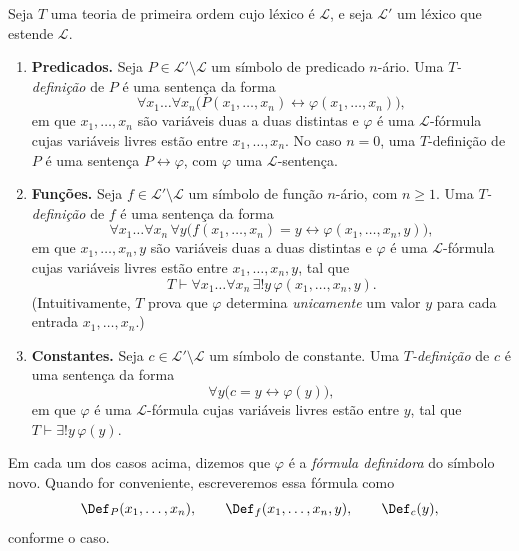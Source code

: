 \begin{metadefinition}[Definições]\label{mdef:definicaoExplicita}
Seja $T$ uma teoria de primeira ordem cujo léxico é $\mathcal L$, e seja $\mathcal L'$ um léxico que estende $\mathcal L$.

\begin{enumerate}[label=(\roman*)]
    \item \textbf{Predicados.}
    Seja $P\in\mathcal L'\setminus\mathcal L$ um símbolo de predicado $n$-ário.
    Uma \emph{$T$-definição} de $P$ é uma sentença da forma
    \[
        \forall x_1\ldots \forall x_n\bigl(P(x_1,\ldots,x_n)\leftrightarrow \varphi(x_1,\ldots,x_n)\bigr),
    \]
    em que $x_1,\ldots,x_n$ são variáveis duas a duas distintas e $\varphi$ é uma $\mathcal L$-fórmula cujas variáveis livres estão entre $x_1,\ldots,x_n$.
    No caso $n=0$, uma $T$-definição de $P$ é uma sentença $P\leftrightarrow \varphi$,
    com $\varphi$ uma $\mathcal L$-sentença.

    \item \textbf{Funções.}
    Seja $f\in\mathcal L'\setminus\mathcal L$ um símbolo de função $n$-ário, com $n\geq 1$.
    Uma \emph{$T$-definição} de $f$ é uma sentença da forma
    \[
        \forall x_1\ldots \forall x_n\,\forall y\bigl(f(x_1,\ldots,x_n)=y \leftrightarrow \varphi(x_1,\ldots,x_n,y)\bigr),
    \]
    em que $x_1,\ldots,x_n,y$ são variáveis duas a duas distintas e $\varphi$ é uma $\mathcal L$-fórmula cujas variáveis livres estão entre $x_1,\ldots,x_n,y$, tal que
    \[
        T\vdash \forall x_1\ldots \forall x_n\,\exists!y\,\varphi(x_1,\ldots,x_n,y).
    \]
    (Intuitivamente, $T$ prova que $\varphi$ determina \emph{unicamente} um valor $y$ para cada entrada $x_1,\ldots,x_n$.)

    \item \textbf{Constantes.}
    Seja $c\in\mathcal L'\setminus\mathcal L$ um símbolo de constante.
    Uma \emph{$T$-definição} de $c$ é uma sentença da forma
    \[
        \forall y\bigl(c=y \leftrightarrow \varphi(y)\bigr),
    \]
    em que $\varphi$ é uma $\mathcal L$-fórmula cujas variáveis livres estão entre $y$, tal que $T\vdash \exists!y\,\varphi(y)$.
\end{enumerate}

Em cada um dos casos acima, dizemos que $\varphi$ é a \emph{fórmula definidora} do símbolo novo.
Quando for conveniente, escreveremos essa fórmula como
\[
\Def_P(x_1,\ldots,x_n),\qquad \Def_f(x_1,\ldots,x_n,y),\qquad \Def_c(y),
\]
conforme o caso.


\end{metadefinition}
